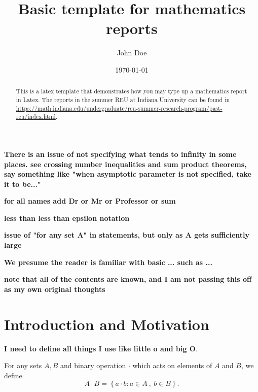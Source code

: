 \documentclass[12pt]{amsart}
\begin{document}
\title{Basic template for mathematics reports} 

\author[Doe]{John Doe}
\address{Department of Mathematics\\
         Research Institution,
         City, State XXXXX
         Country} 
\date{\today}

\begin{abstract}
This is a latex template that demonstrates how you may type up a mathematics report in Latex. The reports in the summer REU at Indiana University can be found in \url{https://math.indiana.edu/undergraduate/reu-summer-research-program/past-reu/index.html}.

\end{abstract}

\maketitle


\textbf{There is an issue of not specifying what tends to infinity in some places. see crossing number inequalities and sum product theorems, say something like "when asymptotic parameter is not specified, take it to be..."}

\textbf{for all names add Dr or Mr or Professor or sum}

\textbf{less than less than epsilon notation}

\textbf{issue of "for any set A" in statements, but only as A gets sufficiently large}

\textbf{We presume the reader is familiar with basic ... such as ... }

\textbf{note that all of the contents are known, and I am not passing this off as my own original thoughts}

\section{Introduction and Motivation} 

\textbf{I need to define all things I use like little o and big O}.

For any sets \(A,B\) and binary operation \(\cdot \) which acts on elements of \(A\) and \(B\), we define
\[
    A \cdot  B = \left\{ a \cdot  b : a \in A~,~ b \in B \right\} 
.\]
\end{document}
